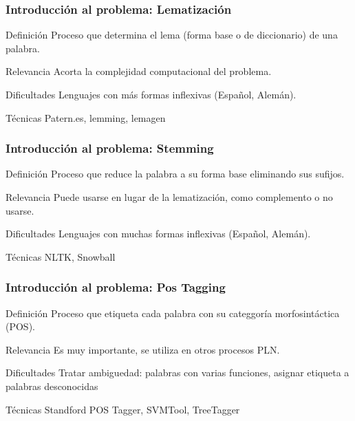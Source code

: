 \documentclass{beamer}
\begin{document}
\begin{frame}
\frametitle{Introducción al problema: Lematización}
\begin{block}{Definición}
Proceso que determina el lema (forma base o de diccionario) de una palabra. 
\end{block}
\begin{block}{Relevancia}
Acorta la complejidad computacional del problema.
\end{block}
\begin{block}{Dificultades}
Lenguajes con más formas inflexivas (Español, Alemán).
\end{block}
\begin{block}{Técnicas}
Patern.es, lemming, lemagen
\end{block}
\end{frame}

\begin{frame}
\frametitle{Introducción al problema: Stemming}
\begin{block}{Definición}
Proceso que reduce la palabra a su forma base eliminando sus sufijos. 
\end{block}
\begin{block}{Relevancia}
Puede usarse en lugar de la lematización, como complemento o no usarse.
\end{block}
\begin{block}{Dificultades}
Lenguajes con muchas formas inflexivas (Español, Alemán).
\end{block}
\begin{block}{Técnicas}
NLTK, Snowball
\end{block}
\end{frame}

\begin{frame}
\frametitle{Introducción al problema: Pos Tagging}
\begin{block}{Definición}
Proceso que etiqueta cada palabra con su categgoría morfosintáctica (POS). 
\end{block}
\begin{block}{Relevancia}
Es muy importante, se utiliza en otros procesos PLN.
\end{block}
\begin{block}{Dificultades}
Tratar ambiguedad: palabras con varias funciones, asignar etiqueta a palabras desconocidas
\end{block}
\begin{block}{Técnicas}
Standford POS Tagger, SVMTool, TreeTagger
\end{block}
\end{frame}
\end{document}
